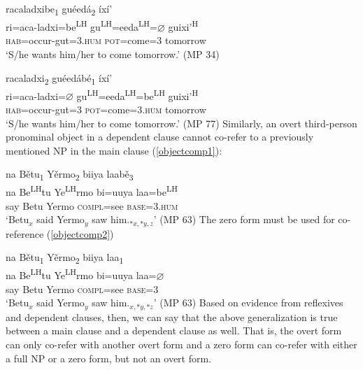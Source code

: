 \ea\label{control3}
\glll racaladxibe\textsubscript{1} gu\'{e}ed\'{a}\textsubscript{2} \'{i}x\'{i}' \\
ri=aca-ladxi=be\textsuperscript{LH}  gu\textsuperscript{LH}=eeda\textsuperscript{LH}={$\varnothing$} guixi'\textsuperscript{H}  \\
\textsc{hab}=occur-gut=\textsc{3.hum} \textsc{pot}=come=\textsc{3} tomorrow \\
\glt `S/he wants him/her to come tomorrow.'  \hfill{(MP 34)}
\z

\ea\label{control4}
\glll racaladxi\textsubscript{2} gu\'{e}ed\'{a}b\'{e}\textsubscript{1} \'{i}x\'{i}' \\
ri=aca-ladxi={$\varnothing$} gu\textsuperscript{LH}=eeda\textsuperscript{LH}=be\textsuperscript{LH}  guixi'\textsuperscript{H}  \\
\textsc{hab}=occur-gut=\textsc{3} \textsc{pot}=come=\textsc{3.hum} tomorrow \\
\glt `S/he wants him/her to come tomorrow.' \hfill{(MP 77)}
\z
Similarly, an overt third-person pronominal object in a dependent clause cannot co-refer to a previously mentioned NP in the main clause (\ref{objectcomp1}):

\ea\label{objectcomp1}
\glll na B\v{e}tu\textsubscript{1} Y\v{e}rmo\textsubscript{2} biiya laab\v{e}\textsubscript{3} \\
na Be\textsuperscript{LH}tu Ye\textsuperscript{LH}rmo bi=uuya laa=be\textsuperscript{LH}  \\
say Betu Yermo \textsc{compl}=see \textsc{base}=\textsc{3.hum} \\
\glt `Betu$_{x}$ said Yermo$_{y}$ saw him.$_{*x, *y, z}$' \hfill{(MP 63)}
\z
The zero form must be used for co-reference (\ref{objectcomp2})

\ea\label{objectcomp2}
\glll na B\v{e}tu\textsubscript{1} Y\v{e}rmo\textsubscript{2} biiya laa\textsubscript{1} \\
na Be\textsuperscript{LH}tu Ye\textsuperscript{LH}rmo bi=uuya laa={$\varnothing$} \\
say Betu Yermo \textsc{compl}=see \textsc{base}=\textsc{3} \\
\glt `Betu$_{x}$ said Yermo$_{y}$ saw him.$_{x, *y, *z}$' \hfill{(MP 63)}
\z
Based on evidence from reflexives and dependent clauses, then, we can say that the above generalization is true between a main clause and a dependent clause as well. That is, the overt form can only co-refer with another overt form and a zero form can co-refer with either a full NP or a zero form, but not an overt form.


